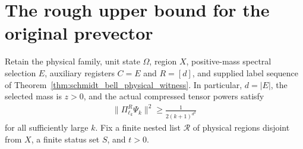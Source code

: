 \section{The rough upper bound for the original prevector}

\begin{theorem}
    \label{thm:bell_physical_rough_upper}
    \leanok
    Retain the physical family, unit state $\Omega$, region $X$, positive-mass
    spectral selection $E$, auxiliary registers $C=E$ and $R=[d]$, and
    supplied label sequence of Theorem~\ref{thm:schmidt_bell_physical_witness}.
    In particular, $d=|E|$, the selected mass is $z>0$, and the actual
    compressed tensor powers satisfy
    \begin{align*}
        \|\Pi^R_{\ell_k}\Psi_k\|^2
        \ge \frac{1}{2(k+1)^{d^2}}
    \end{align*}
    for all sufficiently large $k$. Fix a finite nested list $\mathcal R$
    of physical regions disjoint from $X$, a finite status set $S$, and $t>0$.


\end{theorem}
